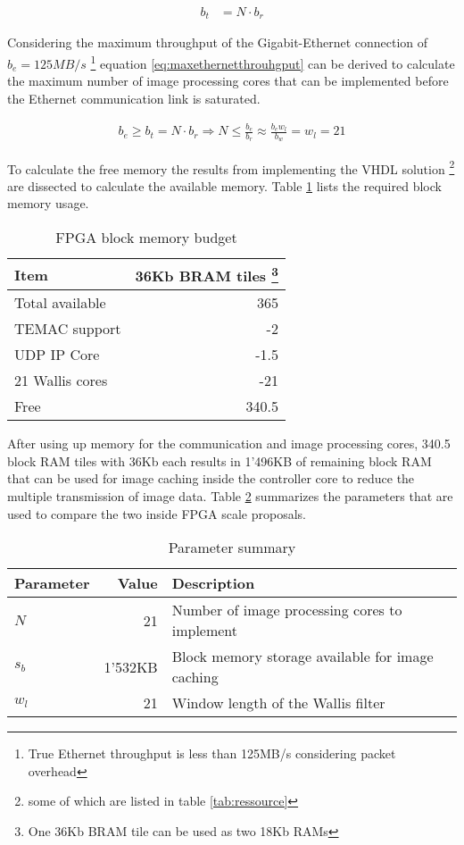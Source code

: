 \begin{align}
    b_t  & = N \cdot b_r
    \label{eq:scaledrealttotalhroughput}
\end{align}

Considering the maximum throughput of the Gigabit-Ethernet connection of
$b_e=125MB/s$ \footnote{True Ethernet throughput is less than 125MB/s
considering packet overhead} equation \ref{eq:maxethernetthrouhgput} can be derived to calculate the
maximum number of image processing cores that can be implemented before the
Ethernet communication link is saturated.

\begin{align}
    b_e \geq b_t = N \cdot b_r \Rightarrow N \leq \frac{b_e}{b_r} \approx 
    \frac{b_e w_l}{b_w} = w_l = 21
    \label{eq:maxethernetthrouhgput}
\end{align}

To calculate the free memory the results from implementing the VHDL solution
\footnote{some of which are listed in table \ref{tab:ressource}} 
are dissected to calculate the available memory. Table \ref{tab:membudget}
lists the required block memory usage.

\begin{table}[h!]
    \centering
    \begin{tabular}{l r}
        \toprule
        Item & 36Kb BRAM tiles \footnote{One 36Kb BRAM tile can be used as two 18Kb RAMs} \\
        \midrule
        Total available & 365 \\
        TEMAC support & -2 \\
        UDP IP Core & -1.5 \\
        21 Wallis cores & -21 \\
        \midrule
        Free & 340.5\\
        \bottomrule
    \end{tabular}
    \caption{FPGA block memory budget}
    \label{tab:membudget}
\end{table}

After using up memory for the communication and image processing cores, 340.5
block RAM tiles with 36Kb each results in 1'496KB of remaining block RAM that
can be used for image caching inside the controller core to reduce the multiple
transmission of image data. Table \ref{tab:parsum} summarizes the
parameters that are used to compare the two inside FPGA scale proposals.

\begin{table}[h!]
    \centering
    \begin{tabular}{l r l}
        \toprule
        Parameter & Value & Description\\
        \midrule
        $N$ & 21 & Number of image processing cores to implement \\
        $s_b$ & 1'532KB & Block memory storage available for image caching \\
        $w_l$ & 21 & Window length of the Wallis filter \\
        \bottomrule
    \end{tabular}
    \caption{Parameter summary}
    \label{tab:parsum}
\end{table}


